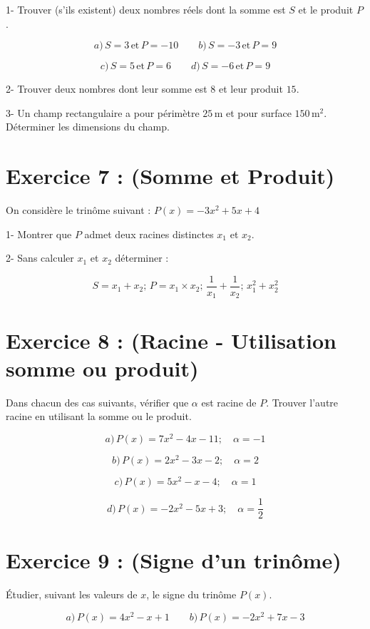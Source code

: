 \documentclass[12pt]{article}
\begin{document}
1- Trouver (s’ils existent) deux nombres réels dont la somme est \( S \) et le produit \( P \).

\[
a) \, S = 3 \, \text{et} \, P = -10 \quad\quad b) \, S = -3 \, \text{et} \, P = 9
\]

\[
c) \, S = 5 \, \text{et} \, P = 6 \quad\quad d) \, S = -6 \, \text{et} \, P = 9
\]

2- Trouver deux nombres dont leur somme est \( 8 \) et leur produit \( 15 \).

3- Un champ rectangulaire a pour périmètre \( 25 \, \text{m} \) et pour surface \( 150 \, \text{m}^2 \). Déterminer les dimensions du champ.

\section*{Exercice 7 : (Somme et Produit)}

On considère le trinôme suivant : \( P(x) = -3x^2 + 5x + 4 \)

1- Montrer que \( P \) admet deux racines distinctes \( x_1 \) et \( x_2 \).

2- Sans calculer \( x_1 \) et \( x_2 \) déterminer :

\[
S = x_1 + x_2 ; \, P = x_1 \times x_2 ; \, \frac{1}{x_1} + \frac{1}{x_2} ; \, x_1^2 + x_2^2
\]

\section*{Exercice 8 : (Racine - Utilisation somme ou produit)}

Dans chacun des cas suivants, vérifier que \( \alpha \) est racine de \( P \). Trouver l’autre racine en utilisant la somme ou le produit.

\[
a) \, P(x) = 7x^2 - 4x - 11 ; \quad \alpha = -1
\]

\[
b) \, P(x) = 2x^2 - 3x - 2 ; \quad \alpha = 2
\]

\[
c) \, P(x) = 5x^2 - x - 4 ; \quad \alpha = 1
\]

\[
d) \, P(x) = -2x^2 - 5x + 3 ; \quad \alpha = \frac{1}{2}
\]

\section*{Exercice 9 : (Signe d’un trinôme)}

Étudier, suivant les valeurs de \( x \), le signe du trinôme \( P(x) \).

\[
a) \, P(x) = 4x^2 - x + 1 \quad\quad b) \, P(x) = -2x^2 + 7x - 3
\]
\end{document}
